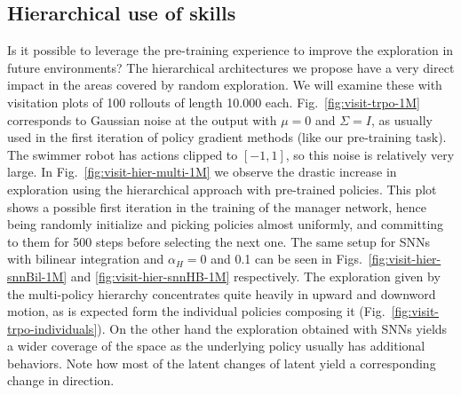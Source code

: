 \documentclass{article} %
\begin{document}
\subsection{Hierarchical use of skills}

Is it possible to leverage the pre-training experience to improve the exploration in future environments? The hierarchical architectures we propose have a very direct impact in the areas covered by random exploration. We will examine these with visitation plots of 100 rollouts of length 10.000 each. Fig.\ \ref{fig:visit-trpo-1M} corresponds to Gaussian noise at the output with $\mu=0$ and $\Sigma=I$, as usually used in the first iteration of policy gradient methods (like our pre-training task). The swimmer robot has actions clipped to $[-1,1]$, so this noise is relatively very large. In Fig.\ \ref{fig:visit-hier-multi-1M} we observe the drastic increase in exploration using the hierarchical approach with pre-trained policies. This plot shows a possible first iteration in the training of the manager network, hence being randomly initialize and picking policies almost uniformly, and committing to them for 500 steps before selecting the next one. The same setup for SNNs with bilinear integration and $\alpha_H= 0$ and 0.1 can be seen in Figs.\ \ref{fig:visit-hier-snnBil-1M} and \ref{fig:visit-hier-snnHB-1M} respectively. The exploration given by the multi-policy hierarchy concentrates quite heavily in upward and downword motion, as is expected form the individual policies composing it (Fig.\ \ref{fig:visit-trpo-individuals}). On the other hand the exploration obtained with SNNs yields a wider coverage of the space as the underlying policy usually has additional behaviors. Note how most of the latent changes of latent yield a corresponding change in direction.
\end{document}
